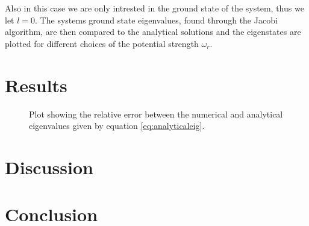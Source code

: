 \documentclass[twocolumn]{aastex62}
\begin{document}
Also in this case we are only intrested in the ground state of the system, thus we let $l=0$. The systems ground state eigenvalues, found through the Jacobi algorithm, are then compared to the analytical solutions and the eigenstates are plotted for different choices of the potential strength $\omega_r$. 
\section{Results} \label{sec:results}
\begin{figure*}[h]
	\caption{Plot showing the relative error between the numerical and analytical eigenvalues given by equation \ref{eq:analyticaleig}. }
	\label{fig:relerr}
\end{figure*}

\begin{figure*}[h]
	\caption{}
	\label{fig:rhomax}
\end{figure*}


\begin{figure*}[h]
	\caption{}
	\label{fig:eigenstates}
\end{figure*}




\section{Discussion} \label{sec:discussion}

\section{Conclusion} \label{sec:conclusion}

\begin{thebibliography}{}
\end{thebibliography}
\end{document}
